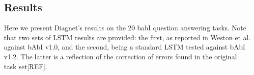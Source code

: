 \documentclass{article}
\begin{document}

\subsection{Results}
Here we present Diagnet's results on the 20 babI question answering tasks.  Note that two sets of LSTM results are provided: the first, as reported in Weston et al. against bAbI v1.0, and the second, being a standard LSTM tested against bAbI v1.2.  The latter is a reflection of the correction of errors found in the original task set[REF].
\end{document}
